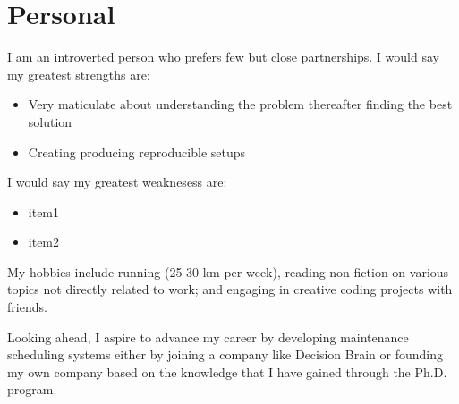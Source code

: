 \section{Personal}


I am an introverted person who prefers few but close partnerships. I would say my greatest strengths are:
\begin{itemize}
	\item Very maticulate about understanding the problem thereafter finding the best solution
	\item Creating producing reproducible setups
\end{itemize}

I would say my greatest weaknesess are:
\begin{itemize}
	\item item1
	\item item2
\end{itemize}
 

My hobbies include running (25-30 km per week), reading non-fiction on various topics not directly related to work; 
and engaging in creative coding projects with friends.

Looking ahead, I aspire to advance my career by developing maintenance scheduling systems
either by joining a company like Decision Brain or founding my own company based on the
knowledge that I have gained through the Ph.D. program.
